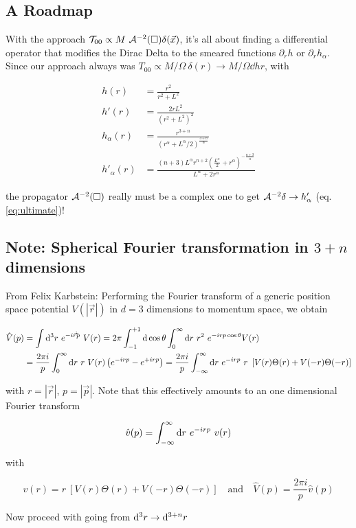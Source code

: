 \documentclass[10pt,a4paper, fleqn]{article}
\begin{document}
\subsection{A Roadmap}
With the approach $\mathcal{T}_{00} \propto M~ \mathcal{A}^{-2}(\square) \delta(\vec x)$, it's all about finding a differential operator that modifies the Dirac Delta to the smeared functions $\partial_r h$ or $\partial_r h_\alpha$. Since our approach always was $T_{00} \propto M/\Omega ~\delta(r) \to M/\Omega \dd{h}{r}$, with

\begin{align}
h(r) &= \frac{r^2}{r^2 + L^2} \label{eq:holo} \\
h'(r) &= \frac{2rL^2}{(r^2 + L^2)^2} \\
h_\alpha(r) &= \frac{r^{3+n}}{(r^\alpha + L^\alpha/2)^{\frac{3+n}{\alpha}}} \label{eq:selfreg} \\
h'_\alpha(r) &= \frac{(n+3) L^{\alpha } r^{n+2}
   \left(\frac{L^{\alpha
   }}{2}+r^{\alpha
   }\right)^{-\frac{n+3}{\alpha
   }}}{L^{\alpha }+2 r^{\alpha
   }} \label{eq:ultimate}
\end{align}

the propagator $\mathcal{A}^{-2}(\square)$ really must be a complex one to get $\mathcal{A}^{-2} \delta \to h'_\alpha$ (eq. \ref{eq:ultimate})!



\subsection{Note: Spherical Fourier transformation in $3+n$ dimensions}
From Felix Karbstein: Performing the Fourier transform of a generic position space potential $V(|\vec r|)$ in $d=3$ dimensions to momentum space, we obtain

\begin{align}
\hat V(p) &= \int \mathrm{d}^3 r ~e^{-i\vec r \dot \vec p}~ V(r) = 2\pi \int_{-1}^{+1} \mathrm{d} \cos \theta \int_0^\infty \mathrm{d} r ~r^2 ~e^{-i r p \cos \theta} V(r) \\
&= \frac{2 \pi i}{p} \int_0^\infty \mathrm{d} r ~r ~V(r) \left( e^{-irp} - e^{+irp} \right) = \frac{2\pi i}{p} \int_{-\infty}^\infty \mathrm{d} r ~e^{-irp} ~r ~\left[ V(r) \Theta(r) + V(-r) \Theta(-r) \right]
\end{align}

with $r=|\vec r|$, $p=|\vec p|$. Note that this effectively amounts to an one dimensional Fourier transform

\begin{equation}
\hat v(p) = \int_{-\infty}^\infty \mathrm{d} r ~e^{-irp} ~v(r)
\end{equation}

with

\begin{equation}
v(r) = r~\left[ V(r) \Theta(r) + V(-r)\Theta(-r)\right]
\quad\text{and}\quad
\hat V(p) = \frac{2\pi i}p \hat v(p)
\end{equation}

Now proceed with going from $\mathrm{d}^3 r \to \mathrm{d}^{3+n} r$
\end{document}
